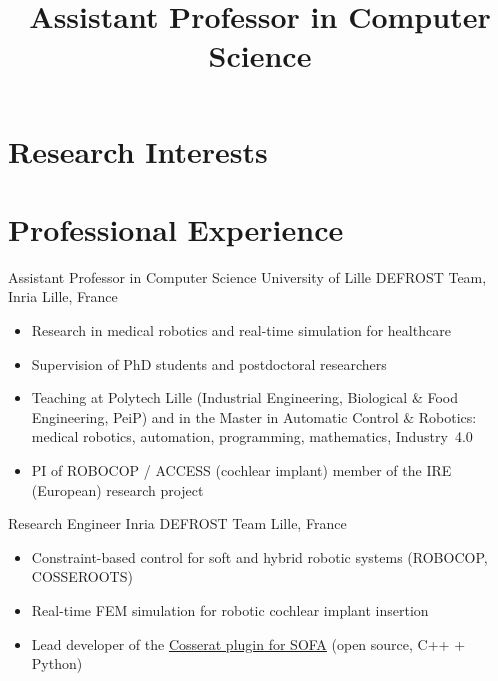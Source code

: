 \documentclass[11pt,a4paper,sans]{moderncv}
\title{Assistant Professor in Computer Science}
\begin{document}
\makecvtitle
\vspace{-8pt}

\section{Research Interests}

\section{Professional Experience}

%
  {Assistant Professor in Computer Science}%
  {University of Lille \textperiodcentered{} DEFROST Team, Inria}%
  {Lille, France}{}%
  {\begin{itemize}[noitemsep,topsep=2pt]
    \item Research in medical robotics and real-time simulation for healthcare
    \item Supervision of PhD students and postdoctoral researchers
    \item Teaching at Polytech Lille (Industrial Engineering, Biological \& Food Engineering, PeiP) and in the Master in Automatic Control \& Robotics: medical robotics, automation, programming, mathematics, Industry~4.0
    \item PI of ROBOCOP / ACCESS (cochlear implant) \textperiodcentered{} member of the IRE (European) research project
  \end{itemize}}

%
  {Research Engineer}%
  {Inria \textperiodcentered{} DEFROST Team}%
  {Lille, France}{}%
  {\begin{itemize}[noitemsep,topsep=2pt]
    \item Constraint-based control for soft and hybrid robotic systems (ROBOCOP, COSSEROOTS)
    \item Real-time FEM simulation for robotic cochlear implant insertion
    \item Lead developer of the \href{https://github.com/SofaDefrost/Cosserat}{Cosserat plugin for SOFA} (open source, C++ + Python)
  \end{itemize}}
\end{document}
